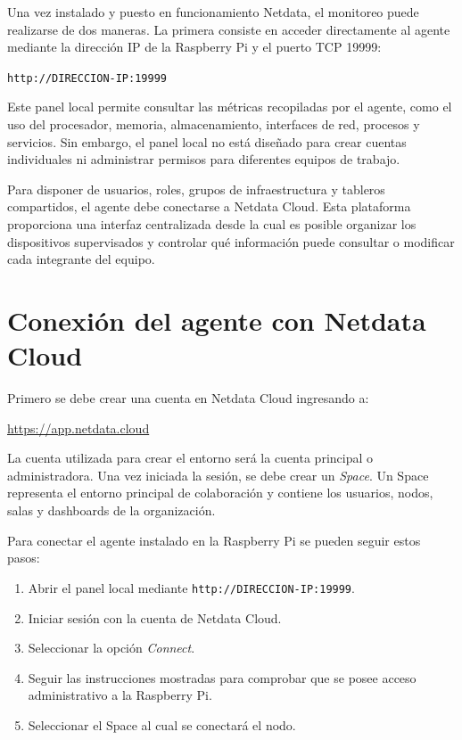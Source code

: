 Una vez instalado y puesto en funcionamiento Netdata, el monitoreo puede realizarse de
dos maneras. La primera consiste en acceder directamente al agente mediante la dirección
IP de la Raspberry Pi y el puerto TCP 19999:

\begin{center}
\texttt{http://DIRECCION-IP:19999}
\end{center}

Este panel local permite consultar las métricas recopiladas por el agente, como el uso del
procesador, memoria, almacenamiento, interfaces de red, procesos y servicios. Sin
embargo, el panel local no está diseñado para crear cuentas individuales ni administrar
permisos para diferentes equipos de trabajo.

Para disponer de usuarios, roles, grupos de infraestructura y tableros compartidos, el
agente debe conectarse a Netdata Cloud. Esta plataforma proporciona una interfaz
centralizada desde la cual es posible organizar los dispositivos supervisados y controlar
qué información puede consultar o modificar cada integrante del equipo.

\section{Conexión del agente con Netdata Cloud}

Primero se debe crear una cuenta en Netdata Cloud ingresando a:

\begin{center}
\url{https://app.netdata.cloud}
\end{center}

La cuenta utilizada para crear el entorno será la cuenta principal o administradora. Una
vez iniciada la sesión, se debe crear un \textit{Space}. Un Space representa el entorno
principal de colaboración y contiene los usuarios, nodos, salas y dashboards de la
organización.

Para conectar el agente instalado en la Raspberry Pi se pueden seguir estos pasos:

\begin{enumerate}
    \item Abrir el panel local mediante \texttt{http://DIRECCION-IP:19999}.
    \item Iniciar sesión con la cuenta de Netdata Cloud.
    \item Seleccionar la opción \textit{Connect}.
    \item Seguir las instrucciones mostradas para comprobar que se posee acceso
          administrativo a la Raspberry Pi.
    \item Seleccionar el Space al cual se conectará el nodo.
\end{enumerate}

